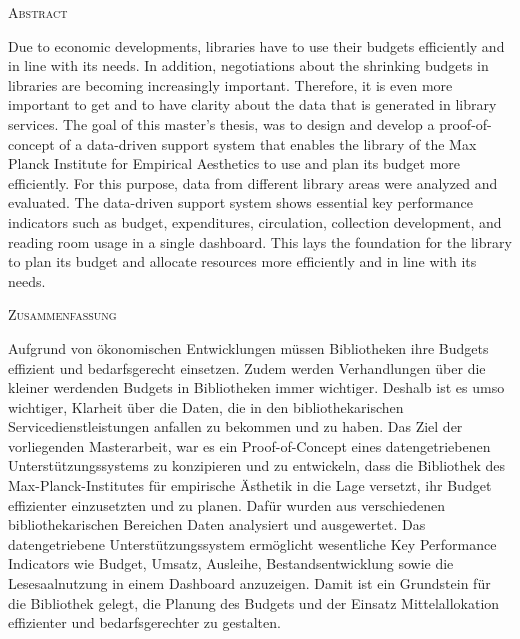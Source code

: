 \begin{center}
    \textsc{Abstract}
  \end{center}
  \noindent
  Due to economic developments, libraries have to use their budgets efficiently and in line with its needs. 
  In addition, negotiations about the shrinking budgets in libraries are becoming increasingly important. 
  Therefore, it is even more important to get and to have clarity about the data that is generated in library services. 
  The goal of this master's thesis, was to design and develop a proof-of-concept of a data-driven support system 
  that enables the library of the Max Planck Institute for Empirical Aesthetics to use and plan its budget more efficiently.
  For this purpose, data from different library areas were analyzed and evaluated. 
  The data-driven support system shows essential key performance indicators such as budget, 
  expenditures, circulation, collection development, and reading room usage in a single dashboard. 
  This lays the foundation for the library to plan its budget and allocate resources more efficiently and in line with its needs.

  

\begin{center}
    \textsc{Zusammenfassung}
  \end{center}

  \noindent
Aufgrund von ökonomischen Entwicklungen müssen Bibliotheken ihre Budgets effizient und bedarfsgerecht einsetzen. 
Zudem werden Verhandlungen über die kleiner werdenden Budgets in Bibliotheken immer wichtiger. 
Deshalb ist es umso wichtiger, Klarheit über die Daten, die in den bibliothekarischen Servicedienstleistungen anfallen zu 
bekommen und zu haben. Das Ziel der vorliegenden Masterarbeit, war es ein Proof-of-Concept eines datengetriebenen Unterstützungssystems 
zu konzipieren und zu entwickeln, dass die Bibliothek des Max-Planck-Institutes für empirische Ästhetik in die Lage versetzt,
ihr Budget effizienter einzusetzten und zu planen. Dafür wurden aus verschiedenen bibliothekarischen Bereichen Daten analysiert 
und ausgewertet. Das datengetriebene Unterstützungssystem ermöglicht wesentliche Key Performance Indicators wie Budget, 
Umsatz, Ausleihe, Bestandsentwicklung sowie die Lesesaalnutzung in einem Dashboard anzuzeigen. 
Damit ist ein Grundstein für die Bibliothek gelegt, die Planung des Budgets und der Einsatz Mittelallokation effizienter
und bedarfsgerechter zu gestalten.
